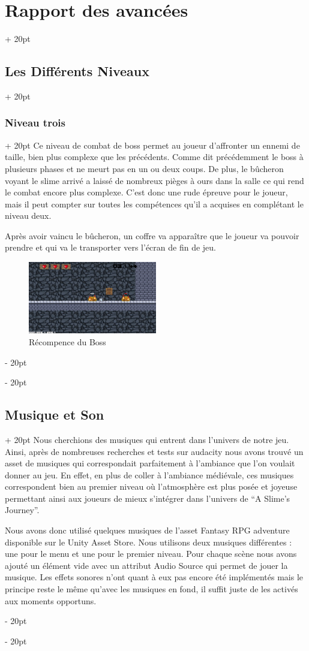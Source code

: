 \documentclass[a4paper, 12pt, twoside]{article}
\newcommand{\ind}[1][20pt]{\advance\leftskip + #1}
\newcommand{\deind}[1][20pt]{\advance\leftskip - #1}
\newenvironment{indt}[2][20pt]{#2 \par \ind[#1]}{\par \deind} %
\begin{document}
\begin{indt}{\section{Rapport des avancées}}
\begin{indt}{\subsection{Les Différents Niveaux}}
\begin{indt}{\subsubsection{Niveau trois}}
                Ce niveau de combat de boss permet au joueur d’affronter un ennemi de taille, bien plus complexe que les précédents. Comme dit précédemment le boss à plusieurs phases et ne meurt pas en un ou deux coups. De plus, le bûcheron voyant le slime arrivé a laissé de nombreux pièges à ours dans la salle ce qui rend le combat encore plus complexe. C’est donc une rude épreuve pour le joueur, mais il peut compter sur toutes les compétences qu’il a acquises en complétant le niveau deux.

                Après avoir vaincu le bûcheron, un coffre va apparaître que le joueur va pouvoir prendre et qui va le transporter vers l’écran de fin de jeu.

                \begin{figure}[h]
                    \centering
                    \includegraphics[width=0.5\textwidth]{Boss2.png}
                    \caption{Récompence du Boss}
                    \label{fig:mesh1}
                \end{figure}
            \end{indt}
        \end{indt}

        \newpage

        \begin{indt}{\subsection{Musique et Son}}
            Nous cherchions des musiques qui entrent dans l'univers de notre jeu. Ainsi, après de nombreuses recherches et tests sur audacity nous avons trouvé un asset de musiques qui correspondait parfaitement à l'ambiance que l'on voulait donner au jeu. En effet, en plus de coller à l'ambiance médiévale, ces musiques correspondent bien au premier niveau où l'atmosphère est plus posée et joyeuse permettant ainsi aux joueurs de mieux s'intégrer dans l'univers de “A Slime's Journey”.

            Nous avons donc utilisé quelques musiques de l'asset Fantasy RPG adventure disponible sur le Unity Asset Store. Nous utilisons deux musiques différentes : une pour le menu et une pour le premier niveau. Pour chaque scène nous avons ajouté un élément vide avec un attribut Audio Source qui permet de jouer la musique. Les effets sonores n'ont quant à eux pas encore été implémentés mais le principe reste le même qu'avec les musiques en fond, il suffit juste de les activés aux moments opportuns.
        \end{indt}


\end{indt}
\end{document}
